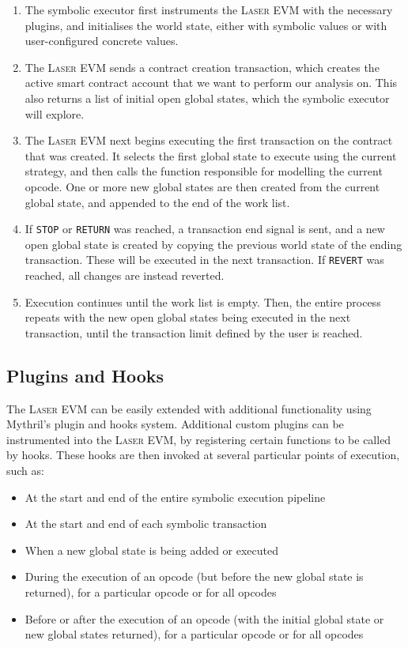 \begin{enumerate}
    \item The symbolic executor first instruments the \textsc{Laser} EVM with the necessary plugins, and
    initialises the world state, either with symbolic values or with user-configured concrete values.
    \item The \textsc{Laser} EVM sends a contract creation transaction, which creates the active smart 
    contract account that we want to perform our analysis on. This also returns a list of initial open global states,
    which the symbolic executor will explore.
    \item The \textsc{Laser} EVM next begins executing the first transaction on the contract that was created.
    It selects the first global state to execute using the current strategy, and then calls the function responsible
    for modelling the current opcode. One or more new global states are then created from the current global state,
    and appended to the end of the work list.
    \item If \texttt{STOP} or \texttt{RETURN} was reached,
    a transaction end signal is sent, and a new open global state is created by copying the previous world state
    of the ending transaction. These will be executed in the next transaction. If \texttt{REVERT} was reached,
    all changes are instead reverted.
    \item Execution continues until the work list is empty. Then, the entire process repeats with the new 
    open global states being executed in the next transaction, until the transaction limit defined by the 
    user is reached.
\end{enumerate}

\subsection{Plugins and Hooks}

The \textsc{Laser} EVM can be easily extended with additional functionality using Mythril's plugin and hooks system. 
Additional custom plugins can be instrumented into the \textsc{Laser} EVM, by registering certain functions
to be called by hooks. These hooks are then invoked at several particular points of execution, such as:

\begin{itemize}
    \item At the start and end of the entire symbolic execution pipeline
    \item At the start and end of each symbolic transaction
    \item When a new global state is being added or executed
    \item During the execution of an opcode (but before the new global state is returned), for a particular opcode or for all opcodes
    \item Before or after the execution of an opcode (with the initial global state or new global states returned), for a particular opcode or for all opcodes
\end{itemize}

